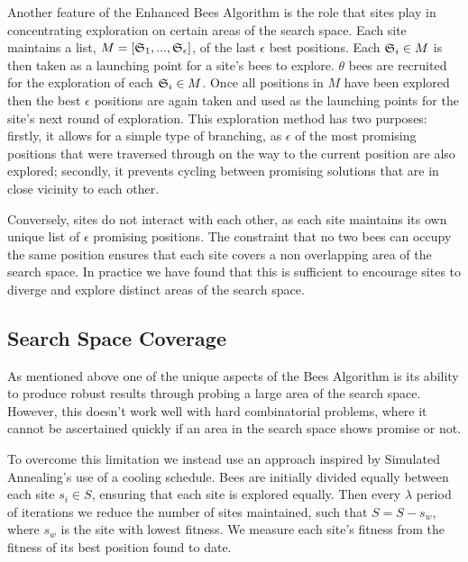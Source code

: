 Another feature of the Enhanced Bees Algorithm is the role that sites play in concentrating exploration on certain areas of the search space. Each site maintains a list, $M = [\mathfrak{S}_1,..., \mathfrak{S}_\epsilon]$, of the last $\epsilon$ best positions. Each $\mathfrak{S}_i \in M$ is then taken as a launching point for a site's bees to explore. $\theta$ bees are recruited for the exploration of each $\mathfrak{S}_i \in M$. Once all positions in $M$ have been explored then the best $\epsilon$ positions are again taken and used as the launching points for the site's next round of exploration. This exploration method has two purposes: firstly, it allows for a simple type of branching, as $\epsilon$ of the most promising positions that were traversed through on the way to the current position are also explored; secondly, it prevents cycling between promising solutions that are in close vicinity to each other.

Conversely, sites do not interact with each other, as each site maintains its own unique list of $\epsilon$ promising positions. The constraint that no two bees can occupy the same position ensures that each site covers a non overlapping area of the search space. In practice we have found that this is sufficient to encourage sites to diverge and explore distinct areas of the search space.    


\subsection{Search Space Coverage}
\label{subsec:searchspacecoverage}

As mentioned above one of the unique aspects of the Bees Algorithm is its ability to produce robust results through probing a large area of the search space. However, this doesn't work well with hard combinatorial problems, where it cannot be ascertained quickly if an area in the search space shows promise or not. 

To overcome this limitation we instead use an approach inspired by Simulated Annealing's use of a cooling schedule. Bees are initially divided equally between each site $s_i \in S$, ensuring that each site is explored equally. Then every $\lambda$ period of iterations we reduce the number of sites maintained, such that $S = S - s_w$, where $s_w$ is the site with lowest fitness. We measure each site's fitness from the fitness of its best position found to date.

